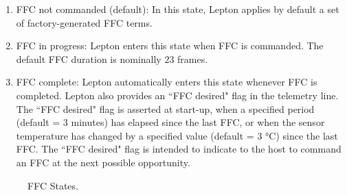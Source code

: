 \begin{enumerate}
    \item FFC not commanded (default): In this state, Lepton applies by default a
set of factory-generated FFC terms.
    \item FFC in progress: Lepton enters this
state when FFC is commanded. The default FFC duration is nominally $23$ frames.
    \item FFC complete: Lepton automatically enters this state whenever FFC is
completed. Lepton also provides an ``FFC desired" flag in the telemetry line.
The ``FFC desired" flag is asserted at start-up, when a specified period
(default = 3 minutes) has elapsed since the last FFC, or when the sensor
temperature has changed by a specified value (default = 3 \si{\celsius}) since
the last FFC. The ``FFC desired" flag is intended to indicate to the host to
command an FFC at the next possible opportunity.
\end{enumerate}
%
\begin{figure}[htb]
    \centering
    \resizebox{0.50\textwidth}{!}{}
    \caption{FFC States.}
    \label{fig:FFC States}
\end{figure}
%
